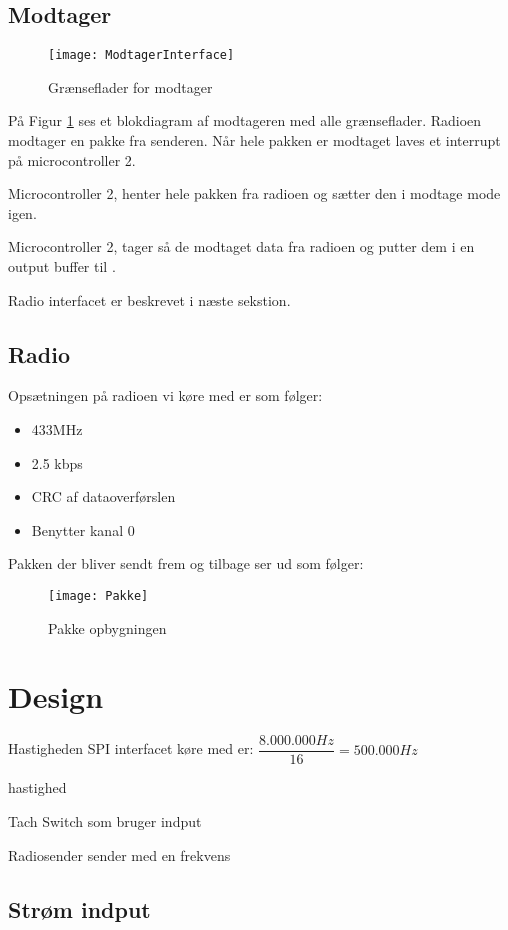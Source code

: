 \documentclass[Main]{subfiles}
\begin{document}
\subsection{Modtager}

\begin{figure}[H]
\centering
\texttt{[image: ModtagerInterface]}
\caption{Grænseflader for modtager}
\label{fig: ModtagerInterface}
\end{figure}
På Figur \ref{fig: ModtagerInterface} ses et blokdiagram af modtageren med alle grænseflader.
Radioen modtager en pakke fra senderen. Når hele pakken er modtaget laves et interrupt på microcontroller 2.

Microcontroller 2, henter hele pakken fra radioen og sætter den i modtage mode igen. 

Microcontroller 2, tager så de modtaget data fra radioen og putter dem i en output buffer til \itoc.

Radio interfacet er beskrevet i næste sekstion.


\subsection{Radio}
Opsætningen på radioen vi køre med er som følger:

\begin{itemize}
\item 433MHz
\item 2.5 kbps
\item CRC af dataoverførslen
\item Benytter kanal 0
\end{itemize}

Pakken der bliver sendt frem og tilbage ser ud som følger:
\begin{figure}[H]
\centering
\texttt{[image: Pakke]}
\caption{Pakke opbygningen}
\label{fig: Pakke}
\end{figure}
\section{Design}

Hastigheden SPI interfacet køre med er:
$ \dfrac{8.000.000 Hz}{16} = 500.000Hz $

\itoc hastighed

Tach Switch som bruger indput

Radiosender sender med en frekvens 

\subsection{Strøm indput}
\end{document}
